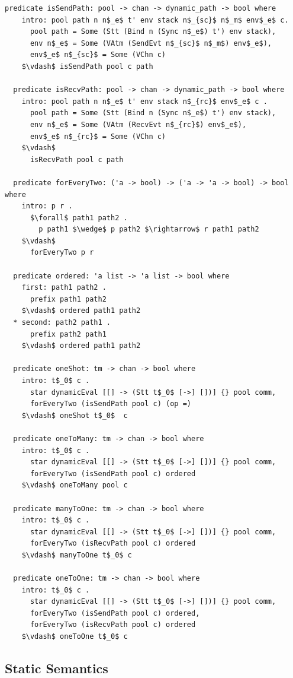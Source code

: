 \documentclass[letterpaper, 11pt]{extarticle}
\begin{document}
\begin{lstlisting}[language=logic, mathescape]
  predicate isSendPath: pool -> chan -> dynamic_path -> bool where
    intro: pool path n n$_e$ t' env stack n$_{sc}$ n$_m$ env$_e$ c.
      pool path = Some (Stt (Bind n (Sync n$_e$) t') env stack),
      env n$_e$ = Some (VAtm (SendEvt n$_{sc}$ n$_m$) env$_e$), 
      env$_e$ n$_{sc}$ = Some (VChn c)
    $\vdash$ isSendPath pool c path

  predicate isRecvPath: pool -> chan -> dynamic_path -> bool where
    intro: pool path n n$_e$ t' env stack n$_{rc}$ env$_e$ c .
      pool path = Some (Stt (Bind n (Sync n$_e$) t') env stack),
      env n$_e$ = Some (VAtm (RecvEvt n$_{rc}$) env$_e$),
      env$_e$ n$_{rc}$ = Some (VChn c)
    $\vdash$
      isRecvPath pool c path

  predicate forEveryTwo: ('a -> bool) -> ('a -> 'a -> bool) -> bool where
    intro: p r .
      $\forall$ path1 path2 .
        p path1 $\wedge$ p path2 $\rightarrow$ r path1 path2
    $\vdash$ 
      forEveryTwo p r

  predicate ordered: 'a list -> 'a list -> bool where
    first: path1 path2 .
      prefix path1 path2
    $\vdash$ ordered path1 path2
  * second: path2 path1 .
      prefix path2 path1
    $\vdash$ ordered path1 path2

  predicate oneShot: tm -> chan -> bool where
    intro: t$_0$ c .
      star dynamicEval [[] -> (Stt t$_0$ [->] [])] {} pool comm,
      forEveryTwo (isSendPath pool c) (op =)
    $\vdash$ oneShot t$_0$  c

  predicate oneToMany: tm -> chan -> bool where
    intro: t$_0$ c .
      star dynamicEval [[] -> (Stt t$_0$ [->] [])] {} pool comm,
      forEveryTwo (isSendPath pool c) ordered
    $\vdash$ oneToMany pool c

  predicate manyToOne: tm -> chan -> bool where
    intro: t$_0$ c .
      star dynamicEval [[] -> (Stt t$_0$ [->] [])] {} pool comm,
      forEveryTwo (isRecvPath pool c) ordered
    $\vdash$ manyToOne t$_0$ c

  predicate oneToOne: tm -> chan -> bool where
    intro: t$_0$ c .
      star dynamicEval [[] -> (Stt t$_0$ [->] [])] {} pool comm,
      forEveryTwo (isSendPath pool c) ordered,
      forEveryTwo (isRecvPath pool c) ordered
    $\vdash$ oneToOne t$_0$ c
\end{lstlisting}


\subsection{Static Semantics}
\end{document}

